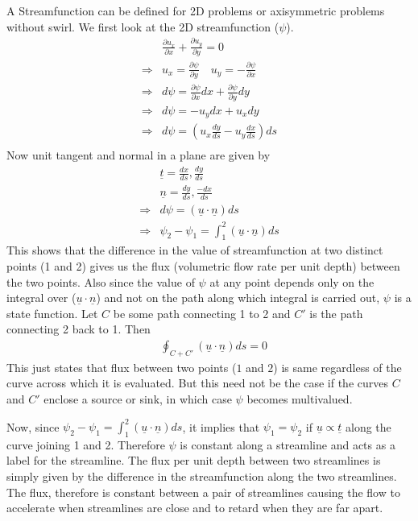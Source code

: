 \documentclass[11pt,a4paper]{article}
\newcommand{\pd}[2]{\frac{\partial #1}{\partial #2}}
\newcommand{\vect}[1]{\underline{#1}}
\newcommand{\1}{\vect{1}}
\newcommand{\RA}{\Rightarrow}
\newcommand{\vu}{\vect{u}}
\begin{document}
A Streamfunction can be defined for 2D problems or axisymmetric problems without swirl. We first look at the 2D streamfunction ($\psi$).
\begin{align*}
&\pd{u_x}{x} + \pd{u_y}{y} = 0\\
\RA& u_x = \pd{\psi}{y} \quad u_y = -\pd{\psi}{x} \tag{identically satisfies continuity}\\
\RA& d\psi = \pd{\psi}{x}dx + \pd{\psi}{y}dy \\
\RA& d\psi = -u_y dx + u_x dy \\
\RA& d\psi = (u_x \frac{dy}{ds}-u_y \frac{dx}{ds})ds \\
\end{align*}
Now unit tangent and normal in a plane are given by
\begin{align*}
&\vect t = \frac{dx}{ds}, \frac{dy}{ds}\\
&\vect n = \frac{dy}{ds}, \frac{-dx}{ds}\\
\RA& d\psi = (\vu\cdot \vect n)ds\\
\RA& \psi_2 - \psi_1 = \int_1^2(\vu\cdot \vect n)ds
\end{align*}
This shows that the difference in the value of streamfunction at two distinct points (1 and 2) gives us the flux (volumetric flow rate per unit depth) between the two points. Also since the value of $\psi$ at any point depends only on the integral over ($\vu \cdot\vect n$) and not on the path along which integral is carried out, $\psi$ is a state function. Let $C$ be some path connecting 1 to 2 and $C'$ is the path connecting 2 back to 1. Then
\begin{align*}
&\oint_{C+C'}(\vu\cdot \vect n)ds = 0
\end{align*}
This just states that flux between two points ($1$ and $2$) is same regardless of the curve across which it is evaluated. But this need not be the case if the curves $C$ and $C'$ enclose a source or sink, in which case $\psi$ becomes multivalued.

Now, since $\psi_2 - \psi_1 = \int_1^2(\vu\cdot \vect n)ds$, it implies that $\psi_1=\psi_2$ if $\vu \propto \vect t$ along the curve joining 1 and 2. Therefore $\psi$ is constant along a streamline and acts as a label for the streamline. The flux per unit depth between two streamlines is simply given by the difference in the streamfunction along the two streamlines. The flux, therefore is constant between a pair of streamlines causing the flow to accelerate when streamlines are close and to retard when they are far apart.
\end{document}
